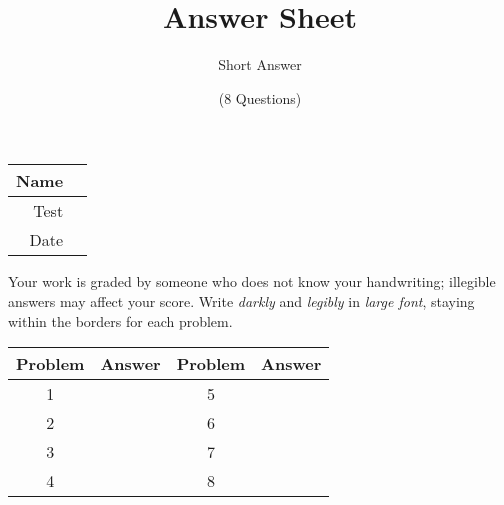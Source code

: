 \documentclass[a4paper, 12pt]{article}
\title{Answer Sheet}
\author{Short Answer}
\date{(8 Questions)}
\begin{document}
\maketitle

\begin{center}
\begin{tabular}{|r|r|}
\hline
	\hspace{3em} Name & \hspace{30em} \\\hline
	Test & \qquad \\ \hline
	Date & \qquad \\ \hline
\end{tabular}
\end{center}

Your work is graded by someone who does not know your handwriting; illegible answers may affect your score. Write \emph{darkly} and \emph{legibly} in \emph{large font}, staying within the borders for each problem.

\begin{tabularx}{\textwidth}{|c|l|c|X|}\hline
	Problem & Answer & Problem & Answer \\\hline
	1 & \hspace{13.45em} & 5 & \\\hline
	2 & & 6 & \\\hline
	3 & & 7 & \\\hline
	4 & & 8 & \\\hline
\end{tabularx}
\end{document}
